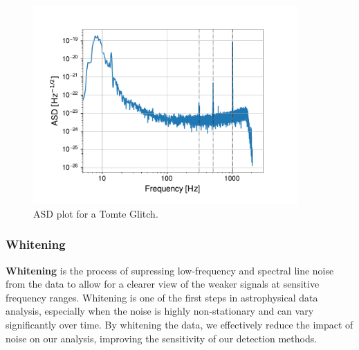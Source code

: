 \documentclass[12pt]{article}
\begin{document}
\begin{figure}[H]
  \centering
  \includegraphics[width=0.9\textwidth]{images/unwhitened_asd.pdf}
  \caption{ASD plot for a Tomte Glitch.}
  \label{fig:asdtomte}
\end{figure}

\subsubsection{Whitening}

\textbf{Whitening} is the process of supressing low-frequency and spectral line noise from the data to allow for a clearer view of the weaker signals at sensitive frequency ranges. Whitening is one of the first steps in astrophysical data analysis, especially when the noise is highly non-stationary and can vary significantly over time. By whitening the data, we effectively reduce the impact of noise on our analysis, improving the sensitivity of our detection methods.
\end{document}
